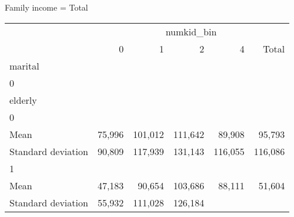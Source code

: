 Family income = Total
\begin{tabular}{llllll}
\cline{1-6}
\multicolumn{1}{c}{} &
  \multicolumn{5}{|c}{numkid\_bin} \\
\multicolumn{1}{c}{} &
  \multicolumn{1}{|r}{0} &
  \multicolumn{1}{r}{1} &
  \multicolumn{1}{r}{2} &
  \multicolumn{1}{r}{4} &
  \multicolumn{1}{r}{Total} \\
\cline{1-6}
\multicolumn{1}{l}{marital} &
  \multicolumn{1}{|r}{} &
  \multicolumn{1}{r}{} &
  \multicolumn{1}{r}{} &
  \multicolumn{1}{r}{} &
  \multicolumn{1}{r}{} \\
\multicolumn{1}{l}{\hspace{1em}0} &
  \multicolumn{1}{|r}{} &
  \multicolumn{1}{r}{} &
  \multicolumn{1}{r}{} &
  \multicolumn{1}{r}{} &
  \multicolumn{1}{r}{} \\
\multicolumn{1}{l}{\hspace{2em}elderly} &
  \multicolumn{1}{|r}{} &
  \multicolumn{1}{r}{} &
  \multicolumn{1}{r}{} &
  \multicolumn{1}{r}{} &
  \multicolumn{1}{r}{} \\
\multicolumn{1}{l}{\hspace{3em}0} &
  \multicolumn{1}{|r}{} &
  \multicolumn{1}{r}{} &
  \multicolumn{1}{r}{} &
  \multicolumn{1}{r}{} &
  \multicolumn{1}{r}{} \\
\multicolumn{1}{l}{\hspace{4em}Mean} &
  \multicolumn{1}{|r}{75,996} &
  \multicolumn{1}{r}{101,012} &
  \multicolumn{1}{r}{111,642} &
  \multicolumn{1}{r}{89,908} &
  \multicolumn{1}{r}{95,793} \\
\multicolumn{1}{l}{\hspace{4em}Standard deviation} &
  \multicolumn{1}{|r}{90,809} &
  \multicolumn{1}{r}{117,939} &
  \multicolumn{1}{r}{131,143} &
  \multicolumn{1}{r}{116,055} &
  \multicolumn{1}{r}{116,086} \\
\multicolumn{1}{l}{\hspace{3em}1} &
  \multicolumn{1}{|r}{} &
  \multicolumn{1}{r}{} &
  \multicolumn{1}{r}{} &
  \multicolumn{1}{r}{} &
  \multicolumn{1}{r}{} \\
\multicolumn{1}{l}{\hspace{4em}Mean} &
  \multicolumn{1}{|r}{47,183} &
  \multicolumn{1}{r}{90,654} &
  \multicolumn{1}{r}{103,686} &
  \multicolumn{1}{r}{88,111} &
  \multicolumn{1}{r}{51,604} \\
\multicolumn{1}{l}{\hspace{4em}Standard deviation} &
  \multicolumn{1}{|r}{55,932} &
  \multicolumn{1}{r}{111,028} &
  \multicolumn{1}{r}{126,184} &

\end{tabular}
